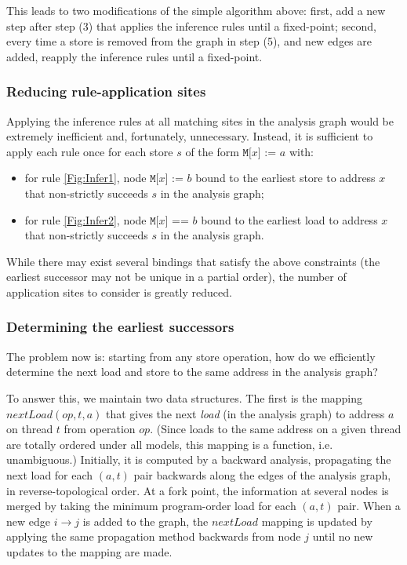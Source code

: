 \documentclass[11pt]{article}
\begin{document}
This leads to two modifications of the simple algorithm above: first,
add a new step after step (3) that applies the inference rules until a
fixed-point; second, every time a store is removed from the
graph in step (5), and new edges are added, reapply the inference rules
until a fixed-point.

\subsubsection*{Reducing rule-application sites}

Applying the inference rules at all matching sites in the analysis
graph would be extremely inefficient and, fortunately, unnecessary.
Instead, it is sufficient to apply each rule once for each store $s$
of the form $\texttt{M[}x\texttt{] := } a$ with:

\begin{itemize}

\item for rule \ref{Fig:Infer1}, node $\texttt{M[}x\texttt{] := } b$
bound to the earliest store to address $x$ that non-strictly succeeds
$s$ in the analysis graph;

\item for rule \ref{Fig:Infer2}, node $\texttt{M[}x\texttt{] == } b$
bound to the earliest load to address $x$ that non-strictly succeeds
$s$ in the analysis graph.

\end{itemize}

\noindent While there may exist several bindings that satisfy the
above constraints (the earliest successor may not be unique in a
partial order), the number of application sites to consider is greatly
reduced.

\subsubsection*{Determining the earliest successors}

The problem now is: starting from any store operation, how do we
efficiently determine the next load and store to the same address in
the analysis graph?

To answer this, we maintain two data structures.  The first is the
mapping $nextLoad(op, t, a)$ that gives the next \emph{load} (in the
analysis graph) to address $a$ on thread $t$ from operation $op$.
(Since loads to the same address on a given thread are totally ordered
under all models, this mapping is a function, i.e. unambiguous.)
Initially, it is computed by a backward analysis, propagating the next
load for each $(a, t)$ pair backwards along the edges of the analysis
graph, in reverse-topological order.  At a fork point, the information
at several nodes is merged by taking the minimum program-order load
for each $(a, t)$ pair.  When a new edge $i \rightarrow j$ is added to
the graph, the $nextLoad$ mapping is updated by applying the same
propagation method backwards from node $j$ until no new updates to the
mapping are made.
\end{document}
